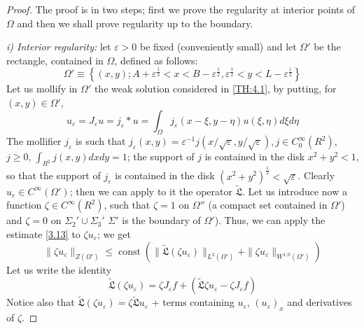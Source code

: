 \documentclass[a4paper,12pt,leqno]{article}
\numberwithin{equation}{section}
\begin{document}
\newpage

\begin{proof}
	The proof is in two steps; first we prove the regularity at interior points of $\Omega$ and then we shall prove regularity up to the boundary.
	
	\medskip 
	\emph{i) Interior regularity:}
	let $\varepsilon>0$ be fixed (conveniently small) and let $\Omega'$ be the rectangle, contained in $\Omega$, defined as follows:
\begin{equation*}
	\Omega' \equiv\left\{(x, y); A+\varepsilon^{\frac 1 2}<x<B-\varepsilon^{\frac 1 2}, \varepsilon^{\frac 1 2}<y<L-\varepsilon^{\frac{1}{2}}\right\}
\end{equation*}
Let us mollify in $\Omega'$ the weak solution considered in \cref{TH:4.1}, by putting, for $(x, y) \in \Omega'$,
\begin{equation}
	u_{\varepsilon}=J_{\varepsilon} u=j_{\varepsilon} \ast u=\int_{\Omega} j_{\varepsilon}(x-\xi, y-\eta) u(\xi, \eta) d \xi d \eta
\end{equation}
The mollifier $j_{\varepsilon}$ is such that $j_{\varepsilon}(x, y)=\varepsilon^{-1} j(x / \sqrt{\varepsilon}, y / \sqrt{\varepsilon}), j \in C_{0}^{\infty}\left(R^{2}\right)$, $j\geqslant0$, $\int_{R^2} j(x, y) d x d y=1$; the support of $j$ is contained in the disk $x^{2}+y^{2}<1$, so that the support of $j_{\varepsilon}$ is contained in the disk $\left(x^{2}+y^{2}\right)^{\frac{1}{2}}<\sqrt{\varepsilon}$. Clearly $u_{\varepsilon} \in C^{\infty}\left(\Omega'\right)$; then we can apply to it the operator $\tilde{\mathfrak{L}}$. Let us introduce now a function $\zeta \in C^{\infty}\left(R^{2}\right)$, such that $\zeta=1$ on $\Omega''$ (a compact set contained in $\Omega'$) and $\zeta=0$ on $\Sigma_{2}' \cup \Sigma_{3}'$ $\Sigma'$ is the boundary of $\Omega'$). Thus, we can apply the estimate \eqref{3.13} to $\zeta u_{\varepsilon}$; we get
\begin{equation} \label{5.3}
	\| \zeta u_\varepsilon \|_{Z(\Omega')} \leqslant
	\operatorname{const} \left(
	\| \tilde{\mathfrak{L}}(\zeta u_\varepsilon) \|_{L^2(\Omega')} + 
	\| \zeta u_\varepsilon \|_{W^{1,0}(\Omega')}
	\right)
\end{equation}
Let us write the identity
\begin{equation*}
	\tilde{\mathfrak{L}}\left(\zeta u_{\varepsilon}\right)
	=\zeta J_{\varepsilon} f + 
	\left(\tilde{\mathfrak{L}} \zeta u_{\varepsilon}-\zeta J_{\varepsilon} f\right)
\end{equation*}
Notice also that $\tilde{\mathfrak{L}} \left(\zeta u_{\varepsilon}\right)=\zeta \tilde{\mathfrak{L}} u_{\varepsilon}$ + terms containing $u_{\varepsilon}$, $\left(u_{\varepsilon}\right)_{x}$ and derivatives of $\zeta$.


\end{proof}
\end{document}
